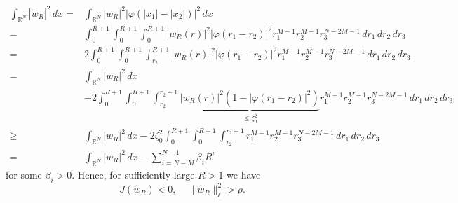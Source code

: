 \documentclass[12pt,leqno,twoside,sort]{amsart}
\newcommand{\R}{\mathbb{R}}
\numberwithin{equation}{section}
\begin{document}
\begin{align*}
\int_{\R^N} | \widetilde{w}_R |^2 \, dx =& \int_{\R^N} |w_R|^2 | \varphi (|x_1|-|x_2|) |^2 \, dx \\
=& \int_0^{R+1} \int_0^{R+1} \int_0^{R+1} | w_R (r) |^2 | \varphi (r_1-r_2) |^2 r_1^{M-1} r_2^{M-1} r_3^{N-2M-1} \, dr_1 \, dr_2 \, dr_3 \\
=& 2 \int_0^{R+1} \int_0^{R+1} \int_{r_2}^{R+1} | w_R (r) |^2 | \varphi (r_1-r_2) |^2 r_1^{M-1} r_2^{M-1} r_3^{N-2M-1} \, dr_1 \, dr_2 \, dr_3 \\
=& \int_{\R^N} |w_R|^2 \, dx \\
&- 2 \int_0^{R+1} \int_0^{R+1} \int_{r_2}^{r_2+1} \underbrace{| w_R (r) |^2 (1 - | \varphi (r_1-r_2) |^2)}_{ \leq \zeta_0^2 } r_1^{M-1} r_2^{M-1} r_3^{N-2M-1} \, dr_1 \, dr_2 \, dr_3 \\
\geq& \int_{\R^N} |w_R|^2 \, dx - 2 \zeta_0^2 \int_0^{R+1} \int_0^{R+1} \int_{r_2}^{r_2+1}  r_1^{M-1} r_2^{M-1} r_3^{N-2M-1} \, dr_1 \, dr_2 \, dr_3 \\ 
=& \int_{\R^N} |w_R|^2 \, dx - \sum_{i=N-M}^{N-1} \beta_i R^i
\end{align*}
for some $\beta_i > 0$. Hence, for sufficiently large $R > 1$ we have 
$$
J(\widetilde{w}_R) < 0, \quad \|\widetilde{w}_R\|_\ell^2 > \rho.
$$
\end{document}
